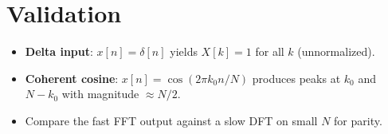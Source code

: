 \documentclass[11pt,a4paper]{article}
\begin{document}
\section{Validation}
\begin{itemize}
  \item \textbf{Delta input}: $x[n]=\delta[n]$ yields $X[k]=1$ for all $k$ (unnormalized).
  \item \textbf{Coherent cosine}: $x[n]=\cos(2\pi k_0 n/N)$ produces peaks at $k_0$ and $N-k_0$ with magnitude $\approx N/2$.
  \item Compare the fast FFT output against a slow DFT on small $N$ for parity.
\end{itemize}
\end{document}
